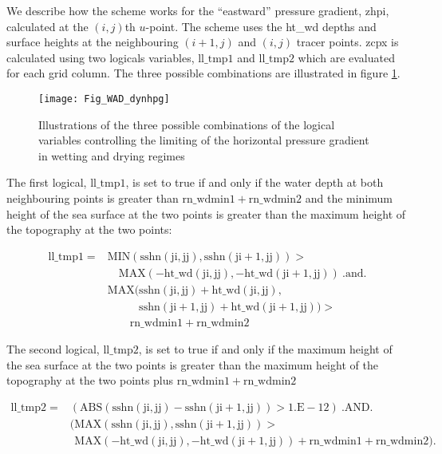 We describe how the scheme works for the ``eastward'' pressure gradient, zhpi, calculated
at the $(i,j)$th $u$-point. The scheme uses the ht\_wd depths and surface heights at the
neighbouring $(i+1,j)$ and $(i,j)$ tracer points.  zcpx is calculated using two logicals
variables, $\mathrm{ll\_tmp1}$ and $\mathrm{ll\_tmp2}$ which are evaluated for each grid
column.  The three possible combinations are illustrated in figure \ref{Fig_WAD_dynhpg}.
\begin{figure}[!ht] \begin{center}
\texttt{[image: Fig\_WAD\_dynhpg]}
\caption{ \label{Fig_WAD_dynhpg}
Illustrations of the three possible combinations of the logical variables controlling the 
limiting of the horizontal pressure gradient in wetting and drying regimes}
\end{center}\end{figure}

The first logical, $\mathrm{ll\_tmp1}$, is set to true if and only if the water depth at
both neighbouring points is greater than $\mathrm{rn\_wdmin1} + \mathrm{rn\_wdmin2}$ and
the minimum height of the sea surface at the two points is greater than the maximum height
of the topography at the two points:

\begin{equation} \label{dyn_ll_tmp1}
\begin{split}
\mathrm{ll\_tmp1}  = & \mathrm{MIN(sshn(ji,jj), sshn(ji+1,jj))} > \\
                     & \quad \mathrm{MAX(-ht\_wd(ji,jj), -ht\_wd(ji+1,jj))\  .and.} \\
& \mathrm{MAX(sshn(ji,jj) + ht\_wd(ji,jj),} \\
& \mathrm{\phantom{MAX(}sshn(ji+1,jj) + ht\_wd(ji+1,jj))} >\\
& \quad\quad\mathrm{rn\_wdmin1 + rn\_wdmin2 }
\end{split}
\end{equation} 

The second logical, $\mathrm{ll\_tmp2}$, is set to true if and only if the maximum height
of the sea surface at the two points is greater than the maximum height of the topography
at the two points plus $\mathrm{rn\_wdmin1} + \mathrm{rn\_wdmin2}$

\begin{equation} \label{dyn_ll_tmp2}
\begin{split}
\mathrm{ ll\_tmp2 } = & \mathrm{( ABS( sshn(ji,jj) - sshn(ji+1,jj) ) > 1.E-12 )\ .AND.}\\
& \mathrm{( MAX(sshn(ji,jj), sshn(ji+1,jj)) > } \\
& \mathrm{\phantom{(} MAX(-ht\_wd(ji,jj), -ht\_wd(ji+1,jj)) + rn\_wdmin1 + rn\_wdmin2}) .
\end{split}
\end{equation} 

